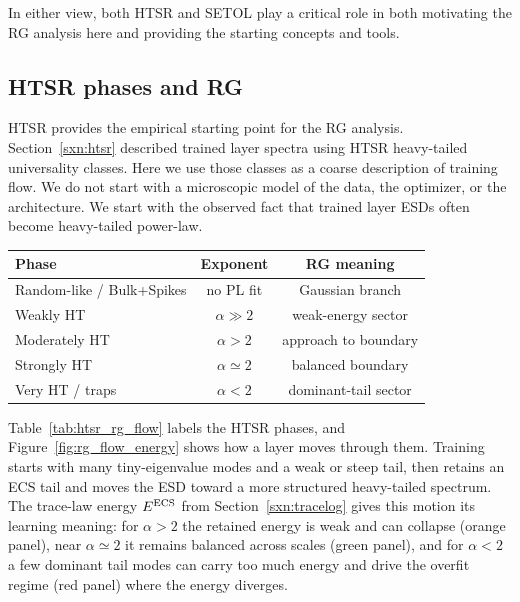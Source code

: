 \documentclass[10pt,twocolumn]{article}
\newif\ifUseTildeECSNotation
\newcommand{\Ered}{\ifUseTildeECSNotation \widetilde E\else E^{\rm ECS}\fi}
\begin{document}
In either view, both HTSR and SETOL play a critical role in both motivating the RG analysis here and providing the starting concepts and tools.

\subsection{HTSR phases and RG}
\label{sxn:htsr_rg}

HTSR provides the empirical starting point for the RG analysis.
Section~\ref{sxn:htsr} described trained layer spectra using HTSR heavy-tailed universality classes.
Here we use those classes as a coarse description of training flow.
We do not start with a microscopic model of the data, the optimizer, or the architecture.
We start with the observed fact that trained layer ESDs often become heavy-tailed power-law.

\begin{center}
\small
\setlength{\tabcolsep}{2.5pt}
\renewcommand{\arraystretch}{1.06}
\label{tab:htsr_rg_flow}
\begin{tabularx}{\linewidth}{@{}lcc@{}}
\toprule
Phase & Exponent & RG meaning \\
\midrule
Random-like / Bulk+Spikes & no PL fit & Gaussian branch \\
Weakly HT & $\alpha\gg2$ & weak-energy sector \\
Moderately HT & $\alpha>2$ & approach to boundary \\
Strongly HT & $\alpha\simeq2$ & balanced boundary \\
Very HT / traps & $\alpha<2$ & dominant-tail sector \\
\bottomrule
\end{tabularx}
\end{center}

Table~\ref{tab:htsr_rg_flow} labels the HTSR phases, and Figure~\ref{fig:rg_flow_energy} shows how a layer moves through them. Training starts with many tiny-eigenvalue modes and a weak or steep tail, then retains an ECS tail and moves the ESD toward a more structured heavy-tailed spectrum.
The trace-law energy $\Ered$ from Section~\ref{sxn:tracelog} gives this motion its learning meaning:
for $\alpha>2$ the retained energy is weak and can collapse (orange panel),
near $\alpha\simeq2$ it remains balanced across scales (green panel),
and for $\alpha<2$ a few dominant tail modes can carry too much energy and drive the overfit regime (red panel)
where the energy diverges.
\end{document}
